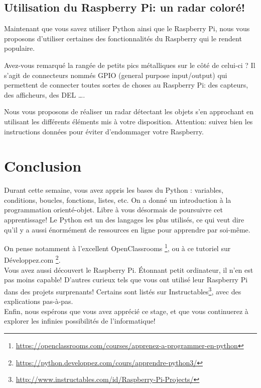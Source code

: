 \documentclass[12pt,a4paper,oneside]{report}
\begin{document}
\section{Utilisation du Raspberry Pi: un radar coloré!}

Maintenant que vous savez utiliser Python ainsi que le Raspberry Pi, nous vous proposons d'utiliser certaines des fonctionnalités du Raspberry qui le rendent populaire.

Avez-vous remarqué la rangée de petits pics métalliques sur le côté de celui-ci ? Il s'agit de connecteurs nommés GPIO (general purpose input/output) qui permettent de connecter toutes sortes de choses au Raspberry Pi: des capteurs, des afficheurs, des DEL \dots.

Nous vous proposons de réaliser un radar détectant les objets s'en approchant en utilisant les différents éléments mis à votre disposition. Attention: suivez bien les instructions données pour éviter d'endommager votre Raspberry.

\chapter{Conclusion}

Durant cette semaine, vous avez appris les bases du Python : variables, conditions, boucles, fonctions, listes, etc. On a donné un introduction à la programmation orienté-objet. Libre à vous désormais de poursuivre cet apprentissage! Le Python est un des langages les plus utilisés, ce qui veut dire qu'il y a aussi énormément de ressources en ligne pour apprendre par soi-même.

On pense notamment à l'excellent OpenClassrooms \footnote{\url{https://openclassrooms.com/courses/apprenez-a-programmer-en-python}}, ou à ce tutoriel sur Développez.com \footnote{\url{https://python.developpez.com/cours/apprendre-python3/}}.\\

Vous avez aussi découvert le Raspberry Pi. Étonnant petit ordinateur, il n'en est pas moins capable! D'autres curieux tels que vous ont utilisé leur Raspberry Pi dans des projets surprenants! Certains sont listés sur Instructables\footnote{\url{http://www.instructables.com/id/Raspberry-Pi-Projects/}}, avec des explications pas-à-pas.\\

Enfin, nous espérons que vous avez apprécié ce stage, et que vous continuerez à explorer les infinies possibilités de l'informatique!



\end{document}
